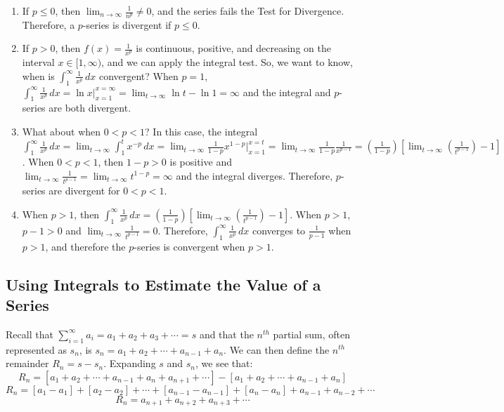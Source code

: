 \begin{Answer}[ref = pseries]
\begin{enumerate}
\item If $p \leq 0$, then $\lim_{n \to \infty} \frac{1}{n^p} \neq 0$, and the 
series fails the Test for Divergence. Therefore, a $p$-series is divergent if 
$p \leq 0$. 
\item If $p > 0$, then $f(x) = \frac{1}{x^p}$ is continuous, positive, and 
decreasing on the interval $x \in [1, \infty)$, and we can apply the integral 
test. So, we want to know, when is $\int_1^\infty \frac{1}{x^p}\,dx$ convergent? 
When $p=1$, $\int_1^\infty \frac{1}{x^p}\,dx = \ln{x}|_{x=1}^{x=\infty} = \lim_
{t \to \infty} \ln{t} - \ln{1} = \infty$ and the integral and $p$-series are 
both divergent.
\item What about when $0 < p < 1$? In this case, the integral $\int_1^\infty \frac{1}{
x^p}\,dx = \lim_{t \to \infty} \int_1^t x^{-p}\,dx = \lim_{t \to \infty} 
\frac{1}{1-p}x^{1-p}|_{x=1}^{x=t} = \lim_{t \to \infty} \frac{1}{1-p}\frac{1}{
x^{p-1}} = \left( \frac{1}{1-p} \right) \left[\lim_{t \to \infty} \left( \frac{
1}{t^{p-1}} \right) - 1 \right]$. When $0 < p < 1$, then $1 - p > 0$ is 
positive and $\lim_{t \to \infty} \frac{1}{t^{p-1}} = \lim_{t \to \infty} t^{1-
p} = \infty$ and the integral diverges. Therefore, $p$-series are divergent for 
$0 < p < 1$.
\item When $p > 1$, then $\int_1^\infty \frac{1}{x^p}\,dx = \left( \frac{1}{1-
p} \right) \left[\lim_{t \to \infty} \left( \frac{1}{t^{p-1}} \right) - 1 
\right]$. When $p > 1$, $p - 1 > 0$ and $\lim_{t \to \infty} \frac{1}{t^{p-1}} 
= 0$. Therefore, $\int_{1}^\infty \frac{1}{x^p}\,dx$ converges to $\frac{1}{p 
- 1}$ when $p > 1$, and therefore the $p$-series is convergent when $p > 1$. 
\end{enumerate}
\end{Answer}

\subsection{Using Integrals to Estimate the Value of a Series}
Recall that $\sum_{i=1}^\infty a_i = a_1 + a_2 + a_3 + \cdots = s$ and that 
the $n^{th}$ partial sum, often represented as $s_n$, is $s_n = a_1 + a_2 + 
\cdots + a_{n-1} + a_n$. We can then define the $n^{th}$ remainder $R_n = s - 
s_n$. Expanding $s$ and $s_n$, we see that:
$$R_n = \left[ a_1 + a_2 + \cdots + a_{n-1} + a_n + a_{n+1} + \cdots \right] - 
\left[ a_1 + a_2 + \cdots + a_{n-1} + a_{n} \right]$$
$$R_n = [a_1 - a_1] + [a_2 - a_2] + \cdots + [a_{n-1} - a_{n-1}] + [a_n - a_n] 
+ a_{n-1} + a_{n-2} + \cdots$$
$$R_n = a_{n+1} + a_{n+2} + a_{n+3} + \cdots$$


